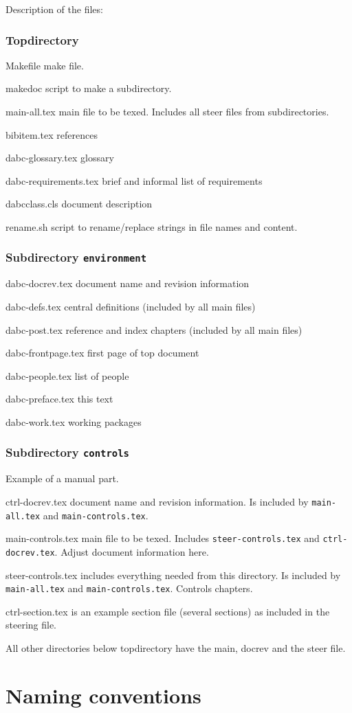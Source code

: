 \clearpage
Description of the files:
\subsubsection{Topdirectory}
\begin{compactdesc}
\item[Makefile] make file.
\item[makedoc] script to make a subdirectory.
\item[main-all.tex] main file to be texed. Includes all steer files from subdirectories.
\item[bibitem.tex] references
\item[dabc-glossary.tex] glossary
\item[dabc-requirements.tex] brief and informal list of requirements
\item[dabcclass.cls] document description
\item[rename.sh] script to rename/replace strings in file names and content.
\end{compactdesc}
\subsubsection{Subdirectory {\tt environment}}
\begin{compactdesc}
\item[dabc-docrev.tex] document name and revision information
\item[dabc-defs.tex] central definitions (included by all main files)
\item[dabc-post.tex] reference and index chapters (included by all main files)
\item[dabc-frontpage.tex] first page of top document
\item[dabc-people.tex] list of people
\item[dabc-preface.tex] this text
\item[dabc-work.tex] working packages
\end{compactdesc}
\subsubsection{Subdirectory {\tt controls}}
Example of a manual part. 
\begin{compactdesc}
\item[ctrl-docrev.tex] document name and revision information.
Is included by {\tt main-all.tex} and {\tt main-controls.tex}.
\item[main-controls.tex] main file to be texed.
Includes {\tt steer-controls.tex} and {\tt ctrl-docrev.tex}. Adjust document information here.
\item[steer-controls.tex] includes everything needed from this directory.
Is included by {\tt main-all.tex} and {\tt main-controls.tex}. Controls chapters.
\item[ctrl-section.tex] is an example section file (several sections)
 as included in the steering file.
\end{compactdesc}
All other directories below topdirectory have the main, docrev and the steer file.
\section{Naming conventions}

